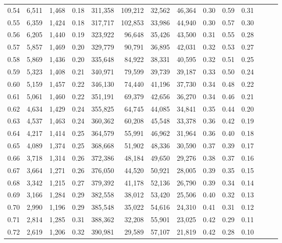 \begin{tabular}{rrrrrrrrrrrrrr}
0.54 &  6,511 &  1,468 &  0.18 &  311,358 &  109,212 &  32,562 &  46,364 &  0.30 &  0.59 &      0.31 \\
0.55 &  6,359 &  1,424 &  0.18 &  317,717 &  102,853 &  33,986 &  44,940 &  0.30 &  0.57 &      0.30 \\
0.56 &  6,205 &  1,440 &  0.19 &  323,922 &   96,648 &  35,426 &  43,500 &  0.31 &  0.55 &      0.28 \\
0.57 &  5,857 &  1,469 &  0.20 &  329,779 &   90,791 &  36,895 &  42,031 &  0.32 &  0.53 &      0.27 \\
0.58 &  5,869 &  1,436 &  0.20 &  335,648 &   84,922 &  38,331 &  40,595 &  0.32 &  0.51 &      0.25 \\
0.59 &  5,323 &  1,408 &  0.21 &  340,971 &   79,599 &  39,739 &  39,187 &  0.33 &  0.50 &      0.24 \\
0.60 &  5,159 &  1,457 &  0.22 &  346,130 &   74,440 &  41,196 &  37,730 &  0.34 &  0.48 &      0.22 \\
0.61 &  5,061 &  1,460 &  0.22 &  351,191 &   69,379 &  42,656 &  36,270 &  0.34 &  0.46 &      0.21 \\
0.62 &  4,634 &  1,429 &  0.24 &  355,825 &   64,745 &  44,085 &  34,841 &  0.35 &  0.44 &      0.20 \\
0.63 &  4,537 &  1,463 &  0.24 &  360,362 &   60,208 &  45,548 &  33,378 &  0.36 &  0.42 &      0.19 \\
0.64 &  4,217 &  1,414 &  0.25 &  364,579 &   55,991 &  46,962 &  31,964 &  0.36 &  0.40 &      0.18 \\
0.65 &  4,089 &  1,374 &  0.25 &  368,668 &   51,902 &  48,336 &  30,590 &  0.37 &  0.39 &      0.17 \\
0.66 &  3,718 &  1,314 &  0.26 &  372,386 &   48,184 &  49,650 &  29,276 &  0.38 &  0.37 &      0.16 \\
0.67 &  3,664 &  1,271 &  0.26 &  376,050 &   44,520 &  50,921 &  28,005 &  0.39 &  0.35 &      0.15 \\
0.68 &  3,342 &  1,215 &  0.27 &  379,392 &   41,178 &  52,136 &  26,790 &  0.39 &  0.34 &      0.14 \\
0.69 &  3,166 &  1,284 &  0.29 &  382,558 &   38,012 &  53,420 &  25,506 &  0.40 &  0.32 &      0.13 \\
0.70 &  2,990 &  1,196 &  0.29 &  385,548 &   35,022 &  54,616 &  24,310 &  0.41 &  0.31 &      0.12 \\
0.71 &  2,814 &  1,285 &  0.31 &  388,362 &   32,208 &  55,901 &  23,025 &  0.42 &  0.29 &      0.11 \\
0.72 &  2,619 &  1,206 &  0.32 &  390,981 &   29,589 &  57,107 &  21,819 &  0.42 &  0.28 &      0.10 \\

\end{tabular}
